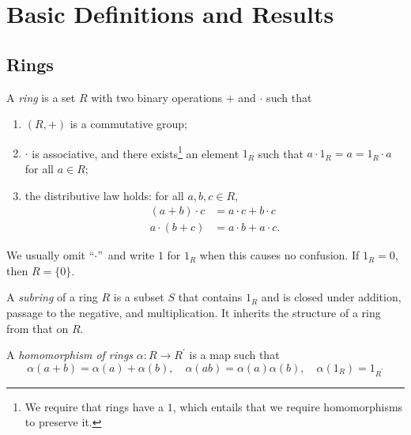 \documentclass[a4paper,11pt,final,openany]{memoir}
\theoremstyle{nonumberplain}
\begin{document}
\clearpage


\pagestyle{ruled}  
 

\chapter{Basic Definitions and Results}

\section{Rings}

A \emph{ring}%
is a set $R$ with two binary operations $+$ and $\cdot$ such that

\begin{enumerate}
\item $(R,+)$ is a commutative group;

\item $\cdot$ is associative, and there exists\footnote{We require that rings
have a $1$, which entails that we require homomorphisms to preserve it.
\par
{}} an element $1_{R}$ such that $a\cdot1_{R}=a=1_{R}\cdot a$ for all $a\in
R;$

\item the distributive law holds: for all $a,b,c\in R$,
\begin{align*}
(a+b)\cdot c  &  =a\cdot c+b\cdot c\\
a\cdot(b+c)  &  =a\cdot b+a\cdot c\text{.}%
\end{align*}

\end{enumerate}

\noindent We usually omit \textquotedblleft$\cdot$\textquotedblright\ and
write $1$ for $1_{R}$ when this causes no confusion. If $1_{R}=0$, then
$R=\{0\}$.

A \emph{subring}%
of a ring $R$ is a subset $S$ that contains $1_{R}$ and is closed under
addition, passage to the negative, and multiplication. It inherits the
structure of a ring from that on $R$.

A \emph{homomorphism of rings}%
$\alpha\colon R\rightarrow R^{\prime}$ is a map such that
\[
\alpha(a+b)=\alpha(a)+\alpha(b),\quad\alpha(ab)=\alpha(a)\alpha(b),\quad
\alpha(1_{R})=1_{R^{\prime}}%
\]
\end{document}
